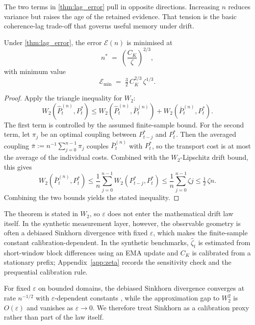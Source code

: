 The two terms in \cref{thm:lag_error} pull in opposite directions. Increasing
$n$ reduces variance but raises the age of the retained evidence. That tension is
the basic coherence-lag trade-off that governs useful memory under drift.

\begin{proposition}\label{prop:coherence_delay}
Under \cref{thm:lag_error}, the error $\mathcal{E}(n)$ is minimised at
\[
  n^* \;=\; \left(\frac{C_K}{\zeta}\right)^{2/3},
\]
with minimum value
\[
  \mathcal{E}_{\min} \;=\; \tfrac{3}{2}\,C_K^{2/3}\,\zeta^{1/3}.
\]
\end{proposition}

\begin{proof}
Apply the triangle inequality for $W_2$:
\[
  W_2\!\left(\widehat P_t^{(n)}, P_t^*\right)
  \leq
  W_2\!\left(\widehat P_t^{(n)}, \bar P_t^{(n)}\right)
  + W_2\!\left(\bar P_t^{(n)}, P_t^*\right).
\]
The first term is controlled by the assumed finite-sample bound.
For the second term, let $\pi_j$ be an optimal coupling between
$P^*_{t-j}$ and $P_t^*$. Then the averaged coupling
$\bar\pi := n^{-1}\sum_{j=0}^{n-1} \pi_j$ couples $\bar P_t^{(n)}$ with
$P_t^*$, so the transport cost is at most the average of the individual costs.
Combined with the $W_2$-Lipschitz drift bound, this gives
\[
  W_2\!\left(\bar P_t^{(n)}, P_t^*\right)
  \leq \frac{1}{n}\sum_{j=0}^{n-1} W_2\!\left(P^*_{t-j}, P_t^*\right)
  \leq \frac{1}{n}\sum_{j=0}^{n-1} \zeta j
  \leq \tfrac{1}{2}\,\zeta n.
\]
Combining the two bounds yields the stated inequality.
\end{proof}

\begin{remark}
The theorem is stated in $W_2$, so $\varepsilon$ does not enter the
mathematical drift law itself. In the synthetic measurement layer, however, the
observable geometry is often a debiased Sinkhorn divergence with fixed
$\varepsilon$, which makes the finite-sample constant calibration-dependent.
In the synthetic benchmarks, $\hat\zeta_t$ is estimated from short-window block
differences using an EMA update and $C_K$ is calibrated from a stationary
prefix; Appendix~\ref{app:zeta} records the sensitivity check and the
prequential calibration rule.

For fixed $\varepsilon$ on bounded domains, the debiased Sinkhorn divergence
converges at rate $n^{-1/2}$ with $\varepsilon$-dependent constants
\citep{GenevayEtAl2019}, while the approximation gap to $W_2^2$ is $O(\varepsilon)$
and vanishes as $\varepsilon\to 0$. We therefore treat Sinkhorn as a calibration
proxy rather than part of the law itself.
\end{remark}

